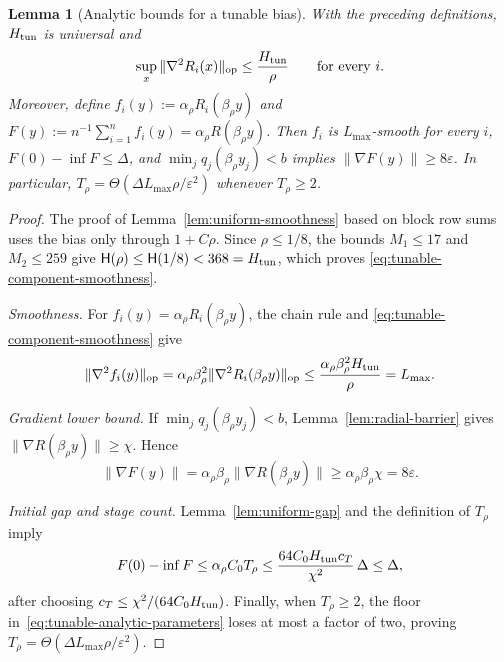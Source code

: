 \documentclass{article}
\newtheorem{lemma}[theorem]{Lemma}
\theoremstyle{definition}
\newcommand{\op}{\mathrm{op}}
\begin{document}
\begin{lemma}[Analytic bounds for a tunable bias]
\label{lem:tunable-bias-analytic}
With the preceding definitions, $H_{\rm tun}$ is universal and
\begin{equation}
 \sup_x\|\nabla^2R_i(x)\|_{\op}\le\frac{H_{\rm tun}}{\rho}
 \qquad\text{for every }i.
 \label{eq:tunable-component-smoothness}
\end{equation}
Moreover, define
$f_i(y):=\alpha_\rho R_i(\beta_\rho y)$ and
$F(y):=n^{-1}\sum_{i=1}^nf_i(y)=\alpha_\rho R(\beta_\rho y)$.
Then $f_i$ is $L_{\max}$-smooth for every $i$,
$F(0)-\inf F\le\Delta$, and
$\min_jq_j(\beta_\rho y_j)<b$ implies
$\|\nabla F(y)\|\ge8\varepsilon$.  In particular,
$T_\rho=\Theta(\Delta L_{\max}\rho/\varepsilon^2)$ whenever $T_\rho\ge2$.
\end{lemma}

\begin{proof}
The proof of Lemma~\ref{lem:uniform-smoothness} based on block row sums uses the bias
only through $1+C\rho$.  Since $\rho\le1/8$, the bounds
$M_1\le17$ and $M_2\le259$ give
$\mathsf H(\rho)\le\mathsf H(1/8)<368=H_{\rm tun}$, which proves
\eqref{eq:tunable-component-smoothness}.

\emph{Smoothness.}
For $f_i(y)=\alpha_\rho R_i(\beta_\rho y)$, the chain rule and
\eqref{eq:tunable-component-smoothness} give
\begin{equation}
 \|\nabla^2 f_i(y)\|_{\op}
 =\alpha_\rho\beta_\rho^2
   \|\nabla^2R_i(\beta_\rho y)\|_{\op}
 \le\frac{\alpha_\rho\beta_\rho^2H_{\rm tun}}\rho
 =L_{\max}.
\end{equation}

\emph{Gradient lower bound.}
If $\min_jq_j(\beta_\rho y_j)<b$, Lemma~\ref{lem:radial-barrier} gives
$\|\nabla R(\beta_\rho y)\|\ge\chi$.  Hence
\begin{equation}
 \|\nabla F(y)\|
 =\alpha_\rho\beta_\rho\|\nabla R(\beta_\rho y)\|
 \ge\alpha_\rho\beta_\rho\chi
 =8\varepsilon.
\end{equation}

\emph{Initial gap and stage count.}
Lemma~\ref{lem:uniform-gap} and the definition of $T_\rho$ imply
\begin{equation}
 F(0)-\inf F
 \le\alpha_\rho C_0T_\rho
 \le\frac{64C_0H_{\rm tun}c_T}{\chi^2}\,\Delta
 \le\Delta,
\end{equation}
after choosing $c_T\le\chi^2/(64C_0H_{\rm tun})$.  Finally, when
$T_\rho\ge2$, the floor in~\eqref{eq:tunable-analytic-parameters} loses at
most a factor of two, proving
$T_\rho=\Theta(\Delta L_{\max}\rho/\varepsilon^2)$.
\end{proof}
\end{document}
